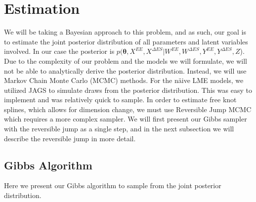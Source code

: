 \documentclass[11pt]{article}\usepackage[]{graphicx}\usepackage[]{color}
\begin{document}
\section{Estimation}

We will be taking a Bayesian approach to this problem, and as such, our goal is to estimate the joint  posterior distribution of all parameters and latent variables involved. In our case the posterior is  $p(\boldsymbol{\theta}, X^{EE},X^{\Delta ES}|W^{EE},W^{\Delta ES},Y^{EE},Y^{\Delta ES},Z$). Due to the complexity of our problem and the models we will formulate, we will not be able to analytically derive the posterior distribution. Instead, we will use Markov Chain Monte Carlo (MCMC) methods. For the n{\"a}ive LME models, we utilized JAGS to simulate draws from the posterior distribution. This was easy to implement and was relatively quick to sample. In order to estimate free knot splines, which allows for dimension change, we must use Reversible Jump MCMC which requires a more complex sampler. We will first present our Gibbs sampler with the reversible jump as a single step, and in the next subsection we will describe the reversible jump in more detail.

\subsection{Gibbs Algorithm}
Here we present our Gibbs algorithm to sample from the joint posterior distribution.
\end{document}
